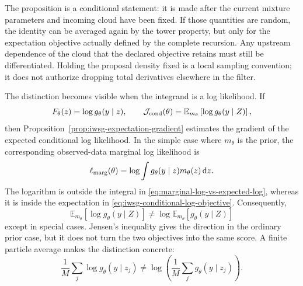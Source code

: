 \documentclass[11pt]{article}
\newcommand{\dd}{\mathrm{d}}
\begin{document}
The proposition is a conditional statement: it is made after the current
mixture parameters and incoming cloud have been fixed. If those quantities
are random, the identity can be averaged again by the tower property, but
only for the expectation objective actually defined by the complete
recursion. Any upstream dependence of the cloud that the declared objective
retains must still be differentiated. Holding the proposal density fixed is a
local sampling convention; it does not authorize dropping total derivatives
elsewhere in the filter.

The distinction becomes visible when the integrand is a log likelihood. If
\begin{equation}
 F_\theta(z)=\log g_\theta(y\mid z),
 \qquad
 \mathcal J_{\rm cond}(\theta)
 =\mathbb E_{m_\theta}\left[\log g_\theta(y\mid Z)\right],
 \label{eq:iwsg-conditional-log-objective}
\end{equation}
then Proposition~\ref{prop:iwsg-expectation-gradient} estimates the gradient
of the expected conditional log likelihood. In the simple case where
$m_\theta$ is the prior, the corresponding observed-data marginal log
likelihood is
\begin{equation}
 \ell_{\rm marg}(\theta)
 =\log\int g_\theta(y\mid z)m_\theta(z)\,\dd z.
 \label{eq:marginal-log-vs-expected-log}
\end{equation}
The logarithm is outside the integral in
\eqref{eq:marginal-log-vs-expected-log}, whereas it is inside the expectation
in \eqref{eq:iwsg-conditional-log-objective}. Consequently,
\begin{equation}
 \mathbb E_{m_\theta}[\log g_\theta(y\mid Z)]
 \ne
 \log\mathbb E_{m_\theta}[g_\theta(y\mid Z)]
 \label{eq:expected-log-not-log-expectation}
\end{equation}
except in special cases. Jensen's inequality gives the direction in the
ordinary prior case, but it does not turn the two objectives into the same
score. A finite particle average makes the distinction concrete:
\begin{equation}
 \frac1M\sum_j\log g_\theta(y\mid z_j)
 \ne
 \log\left(\frac1M\sum_j g_\theta(y\mid z_j)\right).
 \label{eq:finite-log-order}
\end{equation}
\end{document}

